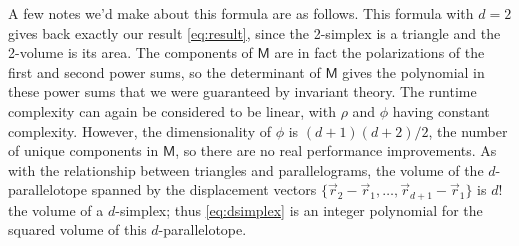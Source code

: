 \documentclass[10pt]{article}
\begin{document}
A few notes we'd make about this formula are as follows.
This formula with $d=2$ gives back exactly our result \eqref{eq:result}, since the 2-simplex is a triangle and the 2-volume is its area.
The components of $\mathsf{M}$ are in fact the polarizations of the first and second power sums, so the determinant of $\mathsf{M}$ gives the polynomial in these power sums that we were guaranteed by invariant theory.
The runtime complexity can again be considered to be linear, with $\rho$ and $\phi$ having constant complexity.
However, the dimensionality of $\phi$ is $(d+1)(d+2)/2$, the number of unique components in $\mathsf{M}$, so there are no real performance improvements.
As with the relationship between triangles and parallelograms, the volume of the $d$-parallelotope spanned by the displacement vectors $\{ \vec{r}_2 - \vec{r}_1, \dots, \vec{r}_{d+1} - \vec{r}_1 \}$ is $d!$ the volume of a $d$-simplex; thus \eqref{eq:dsimplex} is an integer polynomial for the squared volume of this $d$-parallelotope.



\end{document}
